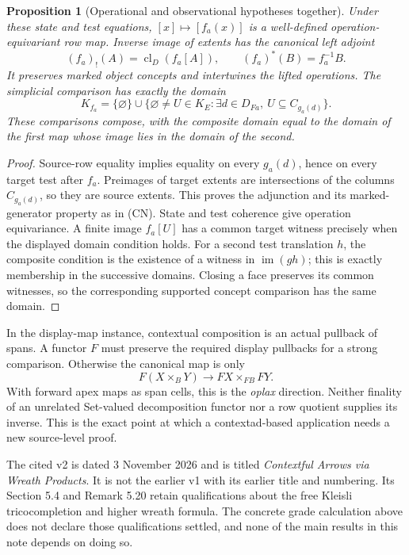\documentclass[11pt]{article}
\newtheorem{proposition}[theorem]{Proposition}
\theoremstyle{definition}\newtheorem{definition}[theorem]{Definition}
\theoremstyle{remark}\newtheorem{remark}[theorem]{Remark}
\newcommand{\cl}{\operatorname{cl}}
\newcommand{\im}{\operatorname{im}}
\begin{document}
\begin{proposition}[Operational and observational hypotheses together]
Under these state and test equations, $[x]\mapsto[f_a(x)]$ is a
well-defined operation-equivariant row map. Inverse image of extents has
the canonical left adjoint
\[
 (f_a)_!(A)=\cl_D(f_a[A]),\qquad (f_a)^*(B)=f_a^{-1}B.
\]
It preserves marked object concepts and intertwines the lifted operations.
The simplicial comparison has exactly the domain
\[
 K_{f_a}=\{\varnothing\}\cup
 \{\varnothing\ne U\in K_E:\exists d\in D_{Fa},\ U\subseteq C_{g_a(d)}\}.
\]
These comparisons compose, with the composite domain equal to the domain
of the first map whose image lies in the domain of the second.
\end{proposition}
\begin{proof}
Source-row equality implies equality on every $g_a(d)$, hence on every
target test after $f_a$. Preimages of target extents are intersections
of the columns $C_{g_a(d)}$, so they are source extents. This proves the
adjunction and its marked-generator property as in (CN). State and test
coherence give operation equivariance. A finite image $f_a[U]$ has a
common target witness precisely when the displayed domain condition holds.
For a second test translation $h$, the composite condition is the
existence of a witness in $\im(gh)$; this is exactly membership in the
successive domains. Closing a face preserves its common witnesses,
so the corresponding supported concept comparison has the same domain.
\end{proof}

In the display-map instance, contextual composition is an actual pullback
of spans. A functor $F$ must preserve the required display pullbacks for
a strong comparison. Otherwise the canonical map is only
\[
 F(X\times_BY)\longrightarrow FX\times_{FB}FY.
\]
With forward apex maps as span cells, this is the \emph{oplax} direction.
Neither finality of an unrelated Set-valued decomposition functor nor a
row quotient supplies its inverse. This is the exact point at which a
contextad-based application needs a new source-level proof.

The cited v2 is dated 3 November 2026 and is titled \emph{Contextful
Arrows via Wreath Products}. It is not the earlier v1 with its earlier
title and numbering. Its Section 5.4 and Remark 5.20 retain qualifications
about the free Kleisli tricocompletion and higher wreath formula. The
concrete grade calculation above does not declare those qualifications
settled, and none of the main results in this note depends on doing so.
\end{document}
